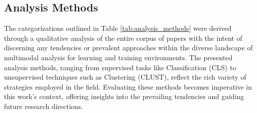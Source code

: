 \documentclass[manuscript,screen,review]{acmart}
\begin{document}
\subsection{Analysis Methods} \label{subsec:analyis_methods}

The categorizations outlined in Table \ref{tab:analysis_methods} were derived through a qualitative analysis of the entire corpus of papers with the intent of discerning any tendencies or prevalent approaches within the diverse landscape of multimodal analysis for learning and training environments. The presented analysis methods, ranging from supervised tasks like Classification (CLS) to unsupervised techniques such as Clustering (CLUST), reflect the rich variety of strategies employed in the field. Evaluating these methods becomes imperative in this work's context, offering insights into the prevailing tendencies and guiding future research directions.
\end{document}
